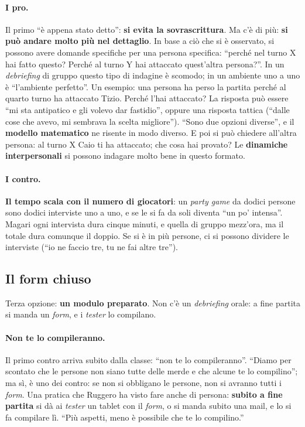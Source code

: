 \paragraph{I pro.} Il primo ``è appena stato detto'': \textbf{si evita la sovrascrittura}.
Ma c'è di più: \textbf{si può andare molto più nel dettaglio}. In base a ciò che si è
osservato, si possono avere domande specifiche per una persona specifica: ``perché nel
turno X hai fatto questo? Perché al turno Y hai attaccato quest'altra persona?''. In un
\emph{debriefing} di gruppo questo tipo di indagine è scomodo; in un ambiente uno a uno è
``l'ambiente perfetto''. Un esempio: una persona ha perso la partita perché al quarto
turno ha attaccato Tizio. Perché l'hai attaccato? La risposta può essere ``mi sta
antipatico e gli volevo dar fastidio'', oppure una risposta tattica (``dalle cose che
avevo, mi sembrava la scelta migliore''). ``Sono due opzioni diverse'', e il
\textbf{modello matematico} ne risente in modo diverso. E poi si può chiedere all'altra
persona: al turno X Caio ti ha attaccato; che cosa hai provato? Le \textbf{dinamiche
interpersonali} si possono indagare molto bene in questo formato.

\paragraph{I contro.} \textbf{Il tempo scala con il numero di giocatori}: un
\emph{party game} da dodici persone sono dodici interviste uno a uno, e se le si fa da
soli diventa ``un po' intensa''. Magari ogni intervista dura cinque minuti, e quella di
gruppo mezz'ora, ma il totale dura comunque il doppio. Se si è in più persone, ci si
possono dividere le interviste (``io ne faccio tre, tu ne fai altre tre'').

\subsection{Il form chiuso}

Terza opzione: \textbf{un modulo preparato}. Non c'è un \emph{debriefing} orale: a fine
partita si manda un \emph{form}, e i \emph{tester} lo compilano.

\paragraph{Non te lo compileranno.} Il primo contro arriva subito dalla classe: ``non te
lo compileranno''. ``Diamo per scontato che le persone non siano tutte delle merde e
che alcune te lo compilino''; ma sì, è uno dei contro: se non si obbligano le persone,
non si avranno tutti i \emph{form}. Una pratica che Ruggero ha visto fare anche di
persona: \textbf{subito a fine partita} si dà ai \emph{tester} un tablet con il
\emph{form}, o si manda subito una mail, e lo si fa compilare lì. ``Più aspetti, meno è
possibile che te lo compilino.''

